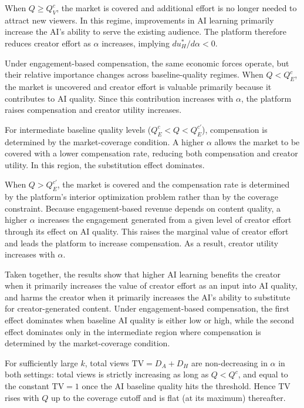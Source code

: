 When $Q\ge Q_V^c$, the market is covered and additional effort is no longer needed to attract new viewers. In this regime, improvements in AI learning primarily increase the AI's ability to serve the existing audience. The platform therefore reduces creator effort as $\alpha$ increases, implying $du_H^*/d\alpha<0$.

Under engagement-based compensation, the same economic forces operate, but their relative importance changes across baseline-quality regimes. When $Q<Q_E^c$, the market is uncovered and creator effort is valuable primarily because it contributes to AI quality. Since this contribution increases with $\alpha$, the platform raises compensation and creator utility increases.

For intermediate baseline quality levels ($Q_E^c<Q<Q_E^{c'}$), compensation is determined by the market-coverage condition. A higher $\alpha$ allows the market to be covered with a lower compensation rate, reducing both compensation and creator utility. In this region, the substitution effect dominates.

When $Q>Q_E^{c'}$, the market is covered and the compensation rate is determined by the platform's interior optimization problem rather than by the coverage constraint. Because engagement-based revenue depends on content quality, a higher $\alpha$ increases the engagement generated from a given level of creator effort through its effect on AI quality. This raises the marginal value of creator effort and leads the platform to increase compensation. As a result, creator utility increases with $\alpha$.

Taken together, the results show that higher AI learning benefits the creator when it primarily increases the value of creator effort as an input into AI quality, and harms the creator when it primarily increases the AI's ability to substitute for creator-generated content. Under engagement-based compensation, the first effect dominates when baseline AI quality is either low or high, while the second effect dominates only in the intermediate region where compensation is determined by the market-coverage condition.


\begin{corollary}\label{cor:alpha_tv}
For sufficiently large $k$, total views $\mathrm{TV}=D_A+D_H$ are non-decreasing in $\alpha$
in both settings: total views is strictly increasing as long as $Q<{Q}^c$, and equal to
the constant $\mathrm{TV}=1$ once the AI baseline quality hits the threshold. Hence $\mathrm{TV}$ rises with
$Q$ up to the coverage cutoff and is flat (at its maximum) thereafter.
\end{corollary}

